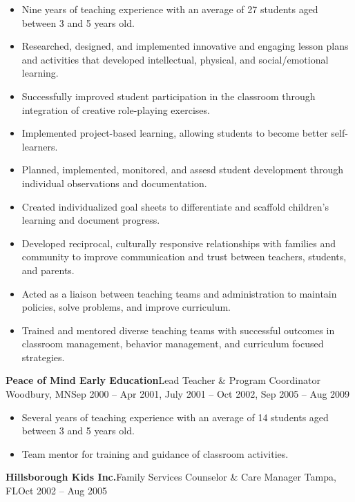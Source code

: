 \documentclass[letterpaper,10pt]{article}
\begin{document}
\begin{itemize}
    \item Nine years of teaching experience with an average of 27 students aged between 3 and 5 years old.
    \item Researched, designed, and implemented innovative and engaging lesson plans and activities that developed intellectual, physical, and social/emotional learning.
    \item Successfully improved student participation in the classroom through integration of creative role-playing exercises.
    \item Implemented project-based learning, allowing students to become better self-learners.
    \item Planned, implemented, monitored, and assesd student development through individual observations and documentation.
    \item Created individualized goal sheets to differentiate and scaffold children's learning and document progress.
    \item Developed reciprocal, culturally responsive relationships with families and community to improve communication
    and trust between teachers, students, and parents.
    \item Acted as a liaison between teaching teams and administration to maintain policies, solve problems, and improve curriculum.
    \item Trained and mentored diverse teaching teams with successful outcomes in classroom management, behavior management, and curriculum focused strategies.
\end{itemize}

\vspace{1pc}
\textbf{Peace of Mind Early Education}\hfill Lead Teacher \& Program Coordinator
\smallbreak Woodbury, MN\hfill Sep 2000 -- Apr 2001, July 2001 -- Oct 2002, Sep 2005 -- Aug 2009

\begin{itemize}
    \item Several years of teaching experience with an average of 14 students aged between 3 and 5 years old.
    \item Team mentor for training and guidance of classroom activities.
\end{itemize}

\vspace{1pc}
\textbf{Hillsborough Kids Inc.}\hfill Family Services Counselor \& Care Manager
\smallbreak Tampa, FL\hfill Oct 2002 -- Aug 2005
\end{document}
